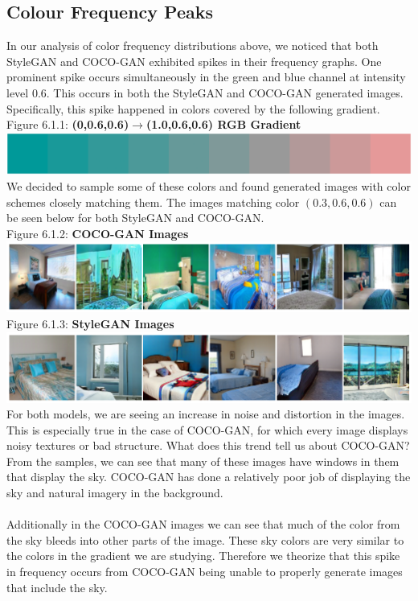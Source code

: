 \documentclass[10pt]{article}
\begin{document}
\begin{multicols*}{2}
        \subsection{Colour Frequency Peaks}
        In our analysis of color frequency distributions above, we noticed that both StyleGAN and COCO-GAN exhibited spikes in their frequency graphs.
        One prominent spike occurs simultaneously in the green and blue channel at intensity level 0.6.
        This occurs in both the StyleGAN and COCO-GAN generated images.
        Specifically, this spike happened in colors covered by the following gradient.\\
        Figure 6.1.1: \textbf{(0,0.6,0.6)$\longrightarrow$(1.0,0.6,0.6) RGB Gradient} \\
        \includegraphics[scale=0.1]{gradient.png} \\
        We decided to sample some of these colors and found generated images with color schemes closely matching them.
        The images matching color $(0.3, 0.6, 0.6)$ can be seen below for both StyleGAN and COCO-GAN. \\
        Figure 6.1.2: \textbf{COCO-GAN Images} \\
\includegraphics[scale=0.28]{color-images/03_06_06_coco_images.png} \\
        Figure 6.1.3: \textbf{StyleGAN Images} \\
\includegraphics[scale=0.28]{color-images/03_06_06_stylegan_images.png} \\
        For both models, we are seeing an increase in noise and distortion in the images.
        This is especially true in the case of COCO-GAN, for which every image displays noisy textures or bad structure.
        What does this trend tell us about COCO-GAN?
        From the samples, we can see that many of these images have windows in them that display the sky.
        COCO-GAN has done a relatively poor job of displaying the sky and natural imagery in the background.
        \\\\
        Additionally in the COCO-GAN images we can see that much of the color from the sky bleeds into other parts of the image.
        These sky colors are very similar to the colors in the gradient we are studying.
        Therefore we theorize that this spike in frequency occurs from COCO-GAN being unable to properly generate images that include the sky.

\end{multicols*}
\end{document}
